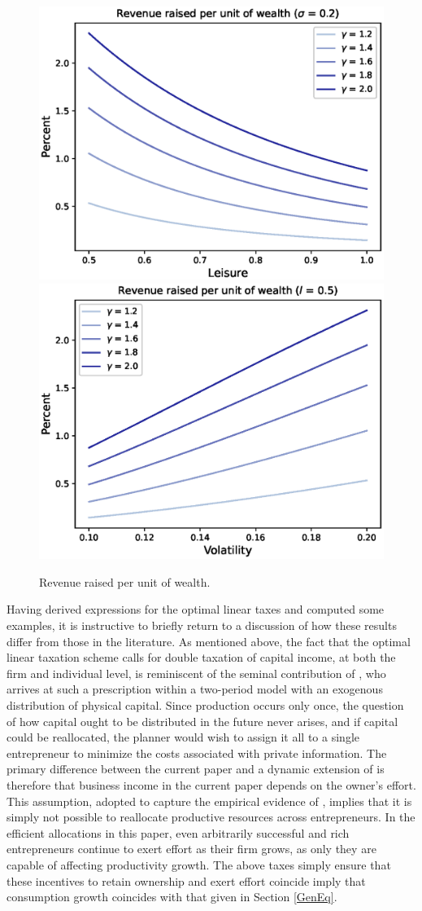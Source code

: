 \documentclass[11pt]{article}
\theoremstyle{plain}
\begin{document}
\begin{figure}[!htb]
\centering
\includegraphics[width=0.49\linewidth]{rev_lgrid}
\includegraphics[width=0.49\linewidth]{rev_sig_grid}
\caption{Revenue raised per unit of wealth.}\label{fig:rev}
\end{figure}

Having derived expressions for the optimal linear taxes and computed some examples, it is instructive to briefly return to a discussion of how these results differ from those in the literature. As mentioned above, the fact that the optimal linear taxation scheme calls for double taxation of capital income, at both the firm and individual level, is reminiscent of the seminal contribution of \cite{albanesi_optimal_2006}, who arrives at such a prescription within a two-period model with an exogenous distribution of physical capital. Since production occurs only once, the question of how capital ought to be distributed in the future never arises, and if capital could be reallocated, the planner would wish to assign it all to a single entrepreneur to minimize the costs associated with private information. The primary difference between the current paper and a dynamic extension of \cite{albanesi_optimal_2006} is therefore that business income in the current paper depends on the owner's effort. This assumption, adopted to capture the empirical evidence of \cite{smith_capitalists_2019}, implies that it is simply not possible to reallocate productive resources across entrepreneurs.  In the efficient allocations in this paper, even arbitrarily successful and rich entrepreneurs continue to exert effort as their firm grows, as only they are capable of affecting productivity growth. The above taxes simply ensure that these incentives to retain ownership and exert effort coincide imply that consumption growth coincides with that given in Section \ref{GenEq}. 
\end{document}
